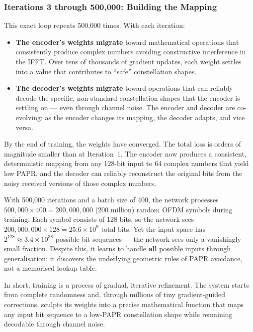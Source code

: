 \subsubsection{Iterations 3 through 500{,}000: Building the Mapping}

This exact loop repeats 500{,}000 times.  With each iteration:
\begin{itemize}
    \item \textbf{The encoder's weights migrate} toward mathematical operations that consistently produce complex numbers avoiding constructive interference in the IFFT. Over tens of thousands of gradient updates, each weight settles into a value that contributes to ``safe'' constellation shapes.

    \item \textbf{The decoder's weights migrate} toward operations that can reliably decode the specific, non-standard constellation shapes that the encoder is settling on --- even through channel noise. The encoder and decoder are co-evolving: as the encoder changes its mapping, the decoder adapts, and vice versa.
\end{itemize}

By the end of training, the weights have converged. The total loss is orders of magnitude smaller than at Iteration~1. The encoder now produces a consistent, deterministic mapping from any 128-bit input to 64 complex numbers that yield low PAPR, and the decoder can reliably reconstruct the original bits from the noisy received versions of those complex numbers.

\begin{workingexample}
    With 500{,}000 iterations and a batch size of 400, the network processes $500{,}000 \times 400 = 200{,}000{,}000$ (200 million) random OFDM symbols during training. Each symbol consists of 128 bits, so the network sees $200{,}000{,}000 \times 128 = 25.6 \times 10^9$ total bits. Yet the input space has $2^{128} \approx 3.4 \times 10^{38}$ possible bit sequences --- the network sees only a vanishingly small fraction. Despite this, it learns to handle \textbf{all} possible inputs through generalisation: it discovers the underlying geometric rules of PAPR avoidance, not a memorised lookup table.
\end{workingexample}

In short, training is a process of gradual, iterative refinement. The system starts from complete randomness and, through millions of tiny gradient-guided corrections, sculpts its weights into a precise mathematical function that maps any input bit sequence to a low-PAPR constellation shape while remaining decodable through channel noise.


